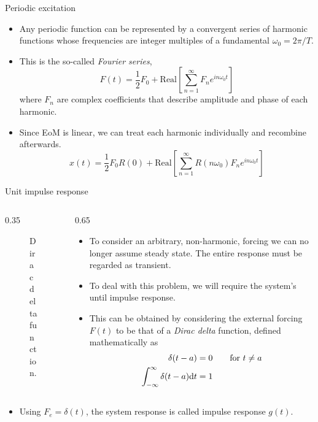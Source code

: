 \documentclass[11pt,aspectratio=169,handout]{beamer}
\begin{document}
\begin{frame}[c]{Periodic excitation}
	\begin{itemize}
		\item<1-> Any periodic function can be represented by a convergent series of harmonic functions whose frequencies are integer multiples of a fundamental $\omega_0 =2\pi/T$. 
		\item<2-> This is the so-called \textit{Fourier series},
		\begin{equation}
			F(t) = \frac{1}{2}F_0 + \mbox{Real}\left[ \sum_{n=1}^\infty F_n e^{in\omega_0 t}\right]
		\end{equation}
	where $F_n$ are complex coefficients that describe amplitude and phase of each harmonic. 
	\item<3-> Since EoM is linear, we can treat each harmonic individually and recombine afterwards. 
	\begin{equation}
		x(t) =  \frac{1}{2}F_0  R(0) + \mbox{Real}\left[\sum_{n=1}^\infty R(n\omega_0)   F_n e^{in\omega_0 t} \right]
	\end{equation}
	\end{itemize}
\end{frame}

\begin{frame}[c]{Unit impulse response}
	\begin{columns}[T]
		\begin{column}{0.35\textwidth}
			\begin{figure}
				\centering
				
				\caption{Dirac delta function.}
			\end{figure}
		\end{column}
		\begin{column}{0.65\textwidth}			
				\begin{itemize}
				\item<1-> To consider an arbitrary, non-harmonic, forcing we can no longer assume steady state. The entire response must be regarded as transient. 
				\item<2-> To deal with this problem, we will require the system's until impulse response.
				\item<3-> This can be obtained by considering the external forcing $F(t)$ to be that of a \textit{Dirac delta} function, defined mathematically as
				\begin{align}
					\delta(t-a) &= 0 \quad \quad \mbox{for } t\neq a\\
					\int_{-\infty}^\infty \delta(t-a){\rm d}t &=1
				\end{align}
			\end{itemize}
		\end{column}
	\end{columns}
	\begin{itemize}
		\item<4->  Using $F_e = \delta(t)$, the system response is called impulse response $g(t)$.
	\end{itemize}
\end{frame}
\end{document}
